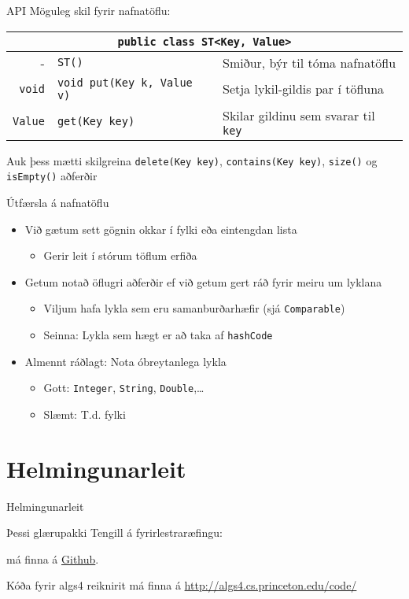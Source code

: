 \documentclass{beamer}
\begin{document}
\begin{frame}{API}
Möguleg skil fyrir nafnatöflu:
\begin{center}
\begin{tabularx}{\textwidth}{rlX}
\toprule
\multicolumn{3}{c}{\texttt{public class ST<Key, Value>}}\\
\midrule
-&\texttt{ST()}& Smiður, býr til tóma nafnatöflu\\
\texttt{void}&\texttt{void put(Key k, Value v)}&Setja lykil-gildis par í töfluna\\
\texttt{Value}&\texttt{get(Key key)}&Skilar gildinu sem svarar til \texttt{key}\\
\bottomrule
\end{tabularx}
\end{center}
Auk þess mætti skilgreina \texttt{delete(Key key)}, \texttt{contains(Key\ key)}, \texttt{size()} og \texttt{isEmpty()} aðferðir
\end{frame}

\begin{frame}{Útfærsla á nafnatöflu}
\begin{itemize}
 \item Við gætum sett gögnin okkar í fylki eða eintengdan lista
 \begin{itemize}
  \item Gerir leit í stórum töflum erfiða
 \end{itemize}
 \item Getum notað öflugri aðferðir ef við getum gert ráð fyrir meiru um lyklana
 \begin{itemize}
  \item Viljum hafa lykla sem eru samanburðarhæfir (sjá \texttt{Comparable})
  \item Seinna: Lykla sem hægt er að taka af \texttt{hashCode}
 \end{itemize}
 \item Almennt ráðlagt: Nota óbreytanlega  lykla
 \begin{itemize}
  \item Gott: \texttt{Integer}, \texttt{String}, \texttt{Double},\ldots
  \item Slæmt: T.d. fylki
 \end{itemize}
\end{itemize}
\end{frame}

\section{Helmingunarleit}

\begin{frame}{Helmingunarleit}
\end{frame}


\begin{frame}{Þessi glærupakki}
Tengill á fyrirlestraræfingu: \url{}
\vspace{1cm}

\texttt{} má finna á \href{https://github.com/Ernir/kennsluefni/tree/master/T2/Code/w8}{Github}. 

Kóða fyrir algs4 reiknirit má finna á \url{http://algs4.cs.princeton.edu/code/}
\end{frame}
\end{document}
